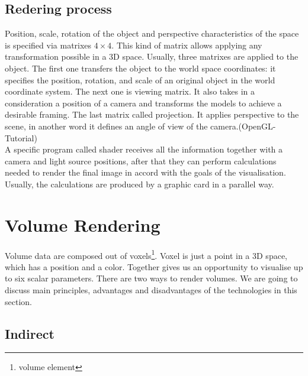\documentclass[twoside, english, 11pt]{report}
\begin{document}
\subsection{Redering process}
Position, scale, rotation of the object and perspective characteristics of the space is specified via matrixes $4\times4$. This kind of matrix allows applying any transformation possible in a 3D space. Usually, three matrixes are applied to the object. The first one transfers the object to the world space coordinates: it specifies the position, rotation, and scale of an original object in the world coordinate system. The next one is viewing matrix. It also takes in a consideration a position of a camera and transforms the models to achieve a desirable framing. The last matrix called projection. It applies perspective to the scene, in another word it defines an angle of view of the camera.(OpenGL-Tutorial)\\

A specific program called shader receives all the information together with a camera and light source positions, after that they can perform calculations needed to render the final image in accord with the goals of the visualisation. Usually, the calculations are produced by a graphic card in a parallel way.

\section{Volume Rendering}

Volume data are composed out of voxels\footnote{volume element}. Voxel is just a point in a 3D space, which has a position and a color. Together gives us an opportunity to visualise up to six scalar parameters. There are two ways to render volumes. We are going to discuss main principles, advantages and disadvantages of the technologies in this section.\\

\subsection{Indirect}
\end{document}
